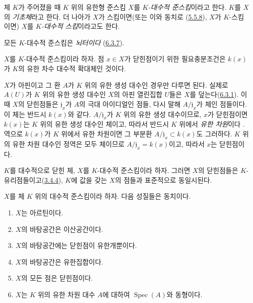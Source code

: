 \begin{definition}[6.4.1]
\label{I.6.4.1-ko}
체 $K$가 주어졌을 때 $K$ 위의 유한형 준스킴 $X$를
\emph{$K$-대수적 준스킴}이라고 한다. $K$를 $X$의 \emph{기초체}라고 한다.
더 나아가 $X$가 스킴이면(또는 이와 동치로
(\hyperref[I.5.5.8-ko]{5.5.8}), $X$가 $K$-스킴이면) $X$를
\emph{$K$-대수적 스킴}이라고도 한다.
\end{definition}

모든 $K$-대수적 준스킴은 \emph{뇌터이다}
(\hyperref[I.6.3.7-ko]{6.3.7}).

\begin{proposition}[6.4.2]
\label{I.6.4.2-ko}
$X$를 $K$-대수적 준스킴이라 하자. 점 $x\in X$가 닫힌점이기 위한
필요충분조건은 $k(x)$가 $K$의 유한 차수 대수적 확대체인 것이다.
\end{proposition}

$X$가 아핀이고 그 환 $A$가 $K$ 위의 유한 생성 대수인 경우만 다루면
된다. 실제로 $A(U)$가 $K$ 위의 유한 생성 대수인 $X$의 아핀 열린집합
$U$들은 $X$를 덮는다(\hyperref[I.6.3.1-ko]{6.3.1}). 이때 $X$의 닫힌점들은
$\mathfrak{j}_x$가
$A$의 극대 아이디얼인 점들, 다시 말해 $A/\mathfrak{j}_x$가 체인 점들이다.
이 체는 반드시 $k(x)$와 같다. $A/\mathfrak{j}_x$가 $K$ 위의 유한 생성
대수이므로, $x$가 닫힌점이면 $k(x)$는 $K$ 위의 유한 생성 대수인 체이고,
따라서 반드시 $K$ 위에서 \emph{유한 차원}이다 \cite{I-21}. 역으로
$k(x)$가 $K$ 위에서 유한 차원이면 그 부분환
$A/\mathfrak{j}_x\subset k(x)$도 그러하다. $K$ 위의 유한 차원 대수인
정역은 모두 체이므로 $A/\mathfrak{j}_x=k(x)$이고, 따라서 $x$는 닫힌점이다.

\begin{corollary}[6.4.3]
\label{I.6.4.3-ko}
$K$를 대수적으로 닫힌 체, $X$를 $K$-대수적 준스킴이라 하자. 그러면
$X$의 닫힌점들은 $K$-유리점들이고(\hyperref[I.3.4.4-ko]{3.4.4}),
$K$에 값을 갖는 $X$의 점들과 표준적으로 동일시된다.
\end{corollary}

\begin{proposition}[6.4.4]
\label{I.6.4.4-ko}
$X$를 체 $K$ 위의 대수적 준스킴이라 하자. 다음 성질들은 동치이다.
\begin{enumerate}
  \item[\rm(a)] $X$는 아르틴이다.
  \item[\rm(b)] $X$의 바탕공간은 이산공간이다.
  \item[\rm(c)] $X$의 바탕공간에는 닫힌점이 유한개뿐이다.
  \item[\rm(c')] $X$의 바탕공간은 유한집합이다.
  \item[\rm(d)] $X$의 모든 점은 닫힌점이다.
  \item[\rm(e)] $X$는 $K$ 위의 유한 차원 대수 $A$에 대하여
    $\operatorname{Spec}(A)$와 동형이다.
\end{enumerate}
\end{proposition}

